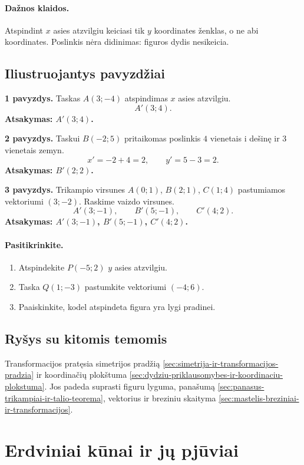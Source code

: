 \paragraph{Dažnos klaidos.}
Atspindint $x$ asies atzvilgiu keiciasi tik $y$ koordinates ženklas, o ne abi koordinates. Poslinkis nėra didinimas: figuros dydis nesikeicia.

\subsection{Iliustruojantys pavyzdžiai}
\textbf{1 pavyzdys.} Taskas $A(3;-4)$ atspindimas $x$ asies atzvilgiu.
\[
A'(3;4).
\]
\textbf{Atsakymas: $A'(3;4)$.}

\textbf{2 pavyzdys.} Taskui $B(-2;5)$ pritaikomas poslinkis $4$ vienetais i dešinę ir $3$ vienetais zemyn.
\[
x'=-2+4=2,\qquad y'=5-3=2.
\]
\textbf{Atsakymas: $B'(2;2)$.}

\textbf{3 pavyzdys.} Trikampio virsunes $A(0;1)$, $B(2;1)$, $C(1;4)$ pastumiamos vektoriumi $(3;-2)$. Raskime vaizdo virsunes.
\[
A'(3;-1),\qquad B'(5;-1),\qquad C'(4;2).
\]
\textbf{Atsakymas: $A'(3;-1)$, $B'(5;-1)$, $C'(4;2)$.}

\paragraph{Pasitikrinkite.}
\begin{enumerate}[label=\alph*)]
\item Atspindekite $P(-5;2)$ $y$ asies atzvilgiu.
\item Taska $Q(1;-3)$ pastumkite vektoriumi $(-4;6)$.
\item Paaiskinkite, kodel atspindeta figura yra lygi pradinei.
\end{enumerate}

\subsection{Ryšys su kitomis temomis}
Transformacijos pratęsia simetrijos pradžią \ref{sec:simetrija-ir-transformacijos-pradzia} ir koordinačių plokštuma \ref{sec:dydziu-priklausomybes-ir-koordinaciu-plokstuma}. Jos padeda suprasti figuru lyguma, panašumą \ref{sec:panasus-trikampiai-ir-talio-teorema}, vektorius ir breziniu skaityma \ref{sec:mastelis-breziniai-ir-transformacijos}.

\section{Erdviniai kūnai ir jų pjūviai}\label{sec:erdviniai-kunai-ir-ju-pjuviai}

